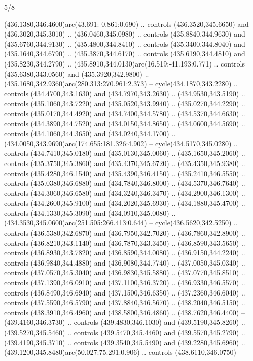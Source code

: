 \begin{flagdescription}{5/8}
\begin{scope}[xshift=0.5\flaglength,yshift=0.5\flagwidth,scale=\flagwidth/475.63]
\begin{scope}[y=0.8pt, x=0.8pt, yscale=-1, xscale=1,shift={(-450,-300)}]
\begin{scope}[cm={{1.0,0.0,0.0,1.0,(-0.0002,0.12556)}},cm={{1.0,0.0,0.0,1.0,(0.00179,0.0)}}]
\begin{scope}[cm={{1.01375,0.0,0.0,1.01375,(-5.36379,-4.94943)}}]
  (436.1380,346.4600)arc(43.691:-0.861:0.690) .. controls (436.3520,345.6650)
  and (436.3020,345.3010) .. (436.0460,345.0980) .. controls (435.8840,344.9630)
  and (435.6760,344.9130) .. (435.4800,344.8410) .. controls (435.3400,344.8040)
  and (435.1640,344.6790) .. (435.3870,344.6170) .. controls (435.6190,344.4810)
  and (435.8230,344.2790) .. (435.8910,344.0130)arc(16.519:-41.193:0.771) ..
  controls (435.6380,343.0560) and (435.3920,342.9800) ..
  (435.1680,342.9360)arc(280.313:270.961:2.373) -- cycle(434.1870,343.2280) ..
  controls (434.4700,343.1630) and (434.7970,343.2630) .. (434.9530,343.5190) ..
  controls (435.1060,343.7220) and (435.0520,343.9940) .. (435.0270,344.2290) ..
  controls (435.0170,344.4920) and (434.7400,344.5780) .. (434.5370,344.6630) ..
  controls (434.3890,344.7520) and (434.0150,344.8650) .. (434.0600,344.5690) ..
  controls (434.1060,344.3650) and (434.0240,344.1700) ..
  (434.0050,343.9690)arc(174.655:181.326:4.902) -- cycle(434.5170,345.0280) ..
  controls (434.7410,345.0180) and (435.0130,345.0060) .. (435.1650,345.2060) ..
  controls (435.3750,345.3860) and (435.4370,345.6720) .. (435.4350,345.9380) ..
  controls (435.4280,346.1540) and (435.4390,346.4150) .. (435.2410,346.5550) ..
  controls (435.0380,346.6880) and (434.7840,346.8000) .. (434.5370,346.7640) ..
  controls (434.3060,346.6580) and (434.3240,346.3470) .. (434.2900,346.1300) ..
  controls (434.2600,345.9100) and (434.2020,345.6930) .. (434.1880,345.4700) ..
  controls (434.1330,345.3090) and (434.0910,345.0080) ..
  (434.3530,345.0600)arc(251.505:266.413:0.644) -- cycle(436.5620,342.5250) ..
  controls (436.5380,342.6870) and (436.7950,342.7020) .. (436.7860,342.8900) ..
  controls (436.8210,343.1140) and (436.7870,343.3450) .. (436.8590,343.5650) ..
  controls (436.8930,343.7820) and (436.8590,344.0080) .. (436.9150,344.2240) ..
  controls (436.9840,344.4880) and (436.9080,344.7740) .. (437.0050,345.0340) ..
  controls (437.0570,345.3040) and (436.9830,345.5880) .. (437.0770,345.8510) ..
  controls (437.1390,346.0910) and (437.1100,346.3720) .. (436.9330,346.5570) ..
  controls (436.8490,346.6940) and (437.1500,346.6350) .. (437.2360,346.6040) ..
  controls (437.5590,346.5790) and (437.8840,346.5670) .. (438.2040,346.5150) ..
  controls (438.3910,346.4960) and (438.5800,346.4860) .. (438.7620,346.4400) --
  (439.4160,346.3730) .. controls (439.4830,346.1030) and (439.5190,345.8260) ..
  (439.5270,345.5460) .. controls (439.5470,345.4460) and (439.5570,345.2790) ..
  (439.4190,345.3710) .. controls (439.3540,345.5490) and (439.2280,345.6960) ..
  (439.1200,345.8480)arc(50.027:75.291:0.906) .. controls (438.6110,346.0750)

\end{scope}
\end{scope}
\end{scope}
\end{scope}
\end{flagdescription}
